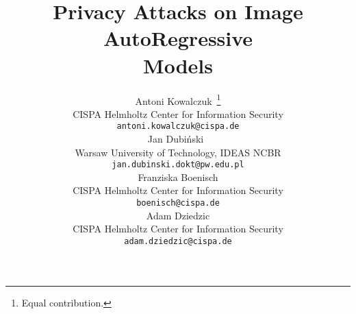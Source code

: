 \documentclass{article} %
\title{Privacy Attacks on Image AutoRegressive \\ Models}
\author{%
Antoni Kowalczuk~\thanks{Equal contribution.} \\
CISPA Helmholtz Center for Information Security \\
\texttt{antoni.kowalczuk@cispa.de} \\
\And
Jan Dubiński~\footnotemark[1] \\
Warsaw University of Technology, IDEAS NCBR \\
\texttt{jan.dubinski.dokt@pw.edu.pl} \\
\AND
Franziska Boenisch \\
CISPA Helmholtz Center for Information Security \\
\texttt{boenisch@cispa.de} \\
\And
Adam Dziedzic \\
CISPA Helmholtz Center for Information Security \\
\texttt{adam.dziedzic@cispa.de} \\
}
\begin{document}
\maketitle

















\newpage
\appendix
\onecolumn

\end{document}
